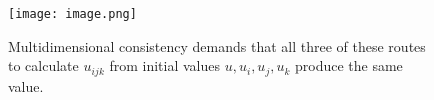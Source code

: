 \documentclass[12pt]{article}
\begin{document}
\begin{figure}[h]
    \centering
    \texttt{[image: image.png]}
    \caption{Multidimensional consistency demands that all three of these routes to calculate $u_{ijk}$ from initial values $u,u_i,u_j,u_k$ produce the same value.}
    \label{fig:multidimensional_consistency}
\end{figure}
\end{document}
